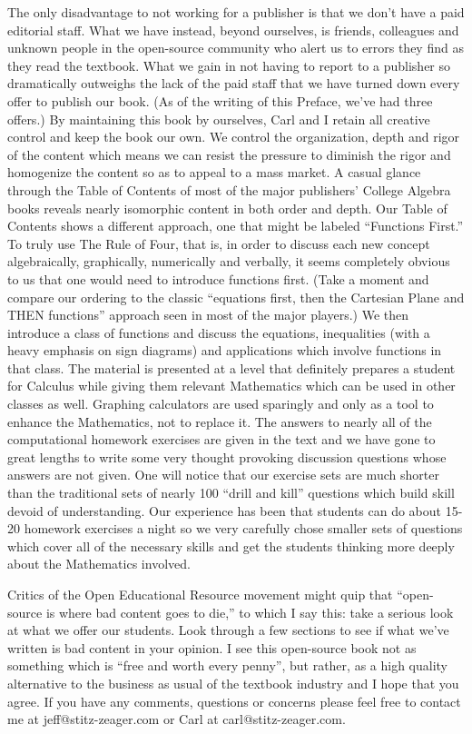 The only disadvantage to not working for a publisher is that we don't have a paid editorial staff.  What we have instead, beyond ourselves, is friends, colleagues and unknown people in the open-source community who alert us to errors they find as they read the textbook.  What we gain in not having to report to a publisher so dramatically outweighs the lack of the paid staff that we have turned down every offer to publish our book.  (As of the writing of this Preface, we've had three offers.)  By maintaining this book by ourselves, Carl and I retain all creative control and keep the book our own.  We control the organization, depth and rigor of the content which means we can resist the pressure to diminish the rigor and homogenize the content so as to appeal to a mass market.  A casual glance through the Table of Contents of most of the major publishers' College Algebra books reveals nearly isomorphic content in both order and depth.   Our Table of Contents shows a different approach, one that might be labeled ``Functions First.''  To truly use The Rule of Four, that is, in order to discuss each new concept algebraically, graphically, numerically and verbally, it seems completely obvious to us that one would need to introduce functions first.  (Take a moment and compare our ordering to the classic ``equations first, then the Cartesian Plane and THEN functions'' approach seen in most of the major players.)  We then introduce a class of functions and discuss the equations, inequalities (with a heavy emphasis on sign diagrams) and applications which involve functions in that class.  The material is presented at a level that definitely prepares a student for Calculus while giving them relevant Mathematics which can be used in other classes as well.  Graphing calculators are used sparingly and only as a tool to enhance the Mathematics, not to replace it.  The answers to nearly all of the computational homework exercises are given in the text and we have gone to great lengths to write some very thought provoking discussion questions whose answers are not given.  One will notice that our exercise sets are much shorter than the traditional sets of nearly 100 ``drill and kill'' questions which build skill devoid of understanding.  Our experience has been that students can do about 15-20 homework exercises a night so we very carefully chose smaller sets of questions which cover all of the necessary skills and get the students thinking more deeply about the Mathematics involved.

Critics of the Open Educational Resource movement might quip that ``open-source is where bad content goes to die,'' to which I say this: take a serious look at what we offer our students.  Look through a few sections to see if what we've written is bad content in your opinion.  I see this open-source book not as something which is ``free and worth every penny'', but rather, as a high quality alternative to the business as usual of the textbook industry and I hope that you agree.  If you have any comments, questions or concerns please feel free to contact me at jeff@stitz-zeager.com or Carl at carl@stitz-zeager.com.

\bigskip

\hfill {}